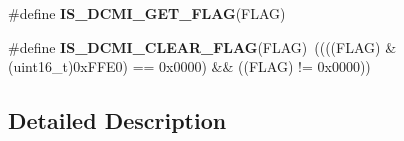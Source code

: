 \begin{DoxyCompactItemize}
\item 
\#define {\bfseries I\-S\-\_\-\-D\-C\-M\-I\-\_\-\-G\-E\-T\-\_\-\-F\-L\-A\-G}(F\-L\-A\-G)
\item 
\hypertarget{group___d_c_m_i___flags_gaf47c4a92fae67d5f5208ba0b222efa7a}{\#define {\bfseries I\-S\-\_\-\-D\-C\-M\-I\-\_\-\-C\-L\-E\-A\-R\-\_\-\-F\-L\-A\-G}(F\-L\-A\-G)~((((F\-L\-A\-G) \& (uint16\-\_\-t)0x\-F\-F\-E0) == 0x0000) \&\& ((\-F\-L\-A\-G) != 0x0000))}\label{group___d_c_m_i___flags_gaf47c4a92fae67d5f5208ba0b222efa7a}

\end{DoxyCompactItemize}


\subsection{Detailed Description}



